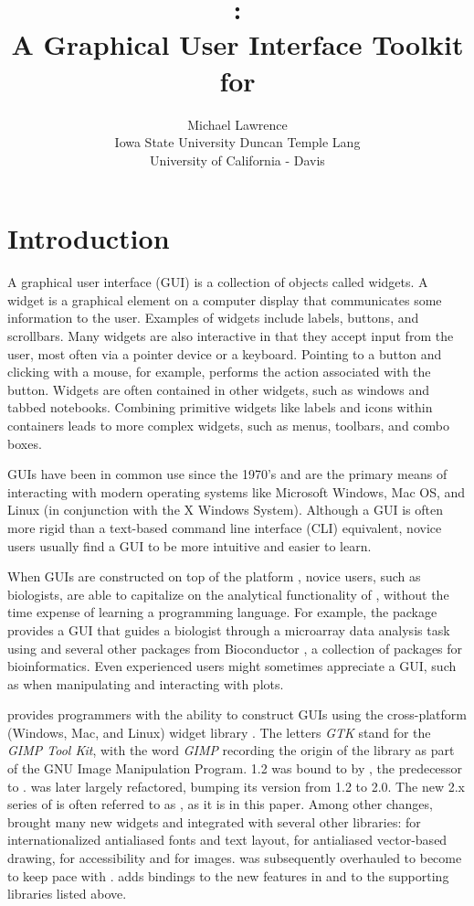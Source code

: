 \documentclass[article]{jss}
\author{Michael Lawrence\\
Iowa State University \And Duncan Temple Lang\\
University of California - Davis}
\title{\pkg{RGtk2}:\\A Graphical User Interface Toolkit for \proglang{R}}
\begin{document}
\section{Introduction}

A graphical user interface (GUI) is a collection of objects called
widgets. A widget is a graphical element on a computer display that
communicates some information to the user. Examples of widgets include
labels, buttons, and scrollbars. Many widgets are also interactive
in that they accept input from the user, most often via a pointer
device or a keyboard. Pointing to a button and clicking with a mouse,
for example, performs the action associated with the button. Widgets
are often contained in other widgets, such as windows and tabbed notebooks.
Combining primitive widgets like labels and icons within containers
leads to more complex widgets, such as menus, toolbars, and combo
boxes. 

GUIs have been in common use since the 1970's and are the primary
means of interacting with modern operating systems like Microsoft
Windows, Mac OS, and Linux (in conjunction with the X Windows System).
Although a GUI is often more rigid than a text-based command line
interface (CLI) equivalent, novice users usually find a GUI to be
more intuitive and easier to learn.

When GUIs are constructed on top of the  platform \citep{R}, novice
users, such as biologists, are able to capitalize on the analytical functionality
of , without the time expense of learning a programming language. 
For example, the  package 
\citep{Limma} provides a GUI that guides a biologist through a microarray
data analysis task using  and several other  packages from Bioconductor
\citep{bioconductor}, a collection of  packages for bioinformatics.
Even experienced  users might sometimes appreciate a GUI, such as when
manipulating and interacting with plots.

 provides  programmers with the ability to construct GUIs using
the  cross-platform (Windows, Mac, and Linux) widget library \citep{GTK}.
The letters \emph{GTK} stand for the \emph{GIMP Tool Kit}, with the
word \emph{GIMP} recording the origin of the library as part of the
GNU Image Manipulation Program.  1.2 was bound to 
 by  \citep{RGtk}, the predecessor
to .  was later largely refactored, bumping its version from 1.2 to 2.0.
The new 2.x series of  is often referred to as , as
it is in this paper. Among other changes,  brought many new widgets 
and integrated  with several other libraries:  \citep{pango} 
for internationalized antialiased fonts and text layout,  \citep{cairo}
for antialiased vector-based drawing,  \citep{atk} for accessibility
and  \citep{gdkpixbuf} for images.  was subsequently 
overhauled to become  to keep pace with .  adds 
bindings to the new features in  and to the supporting libraries 
listed above. 
\end{document}
